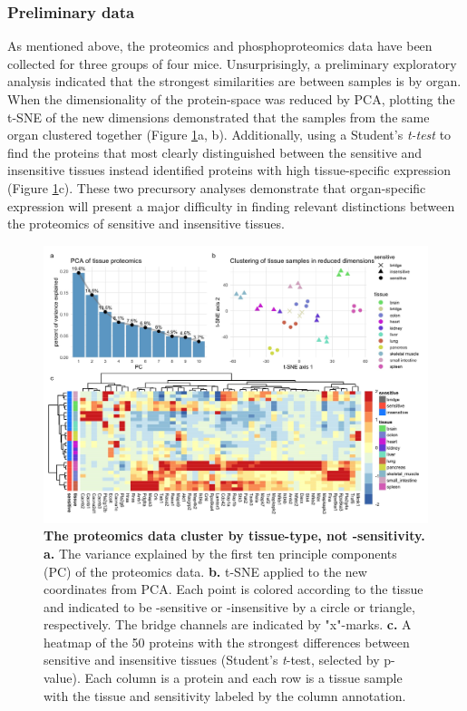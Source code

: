 
\subsubsection*{Preliminary data}

As mentioned above, the proteomics and phosphoproteomics data have been collected for three groups of four mice.
Unsurprisingly, a preliminary exploratory analysis indicated that the strongest similarities are between samples is by organ.
When the dimensionality of the protein-space was reduced by PCA, plotting the t-SNE of the new dimensions demonstrated that the samples from the same organ clustered together (Figure \ref{fig:proteomics-eda}a, b).
Additionally, using a Student's \emph{t-test} to find the proteins that most clearly distinguished between the sensitive and insensitive tissues instead identified proteins with high tissue-specific expression (Figure \ref{fig:proteomics-eda}c).
These two precursory analyses demonstrate that organ-specific expression will present a major difficulty in finding relevant distinctions between the proteomics of sensitive and insensitive tissues.

\begin{figure}[ht]
\centering
\includegraphics[width=180mm]{figures/aim2/proteomics-eda_figure.jpeg}
\caption{
    \textbf{The proteomics data cluster by tissue-type, not \KRAS{}-sensitivity.}
    \textbf{a.} The variance explained by the first ten principle components (PC) of the proteomics data.
    \textbf{b.} t-SNE applied to the new coordinates from PCA. Each point is colored according to the tissue and indicated to be \KRAS{}-sensitive or -insensitive by a circle or triangle, respectively. The bridge channels are indicated by "x"-marks.
    \textbf{c.} A heatmap of the 50 proteins with the strongest differences between sensitive and insensitive tissues (Student's \emph{t}-test, selected by p-value). Each column is a protein and each row is a tissue sample with the tissue and \KRAS{} sensitivity labeled by the column annotation.
}
\label{fig:proteomics-eda}
\end{figure}


